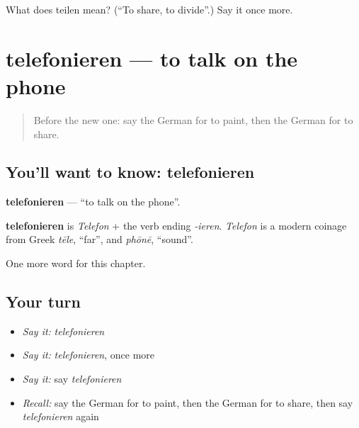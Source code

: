 \begin{tcolorbox}[breakable,colback=teal!4,colframe=teal!35!black,title={Before you move on}]
What does teilen mean? (\textquotedblleft{}To share, to divide\textquotedblright{}.) Say it once more.
\end{tcolorbox}
\section[telefonieren]{telefonieren — to talk on the phone}

\label{lesson:GE-C188-telefonieren}



\begin{quote}
Before the new one: say the German for to paint, then the German for to share.
\end{quote}

\subsection*{You'll want to know: telefonieren}
\textbf{telefonieren} — \textquotedblleft{}to talk on the phone\textquotedblright{}.

\begin{cousinweb}
\textbf{telefonieren} is \emph{Telefon} + the verb ending \emph{-ieren}. \emph{Telefon} is a modern coinage from Greek \emph{tēle}, \textquotedblleft{}far\textquotedblright{}, and \emph{phōnē}, \textquotedblleft{}sound\textquotedblright{}.
\end{cousinweb}

\begin{grammarlens}[title={What you've built}]
One more word for this chapter.
\end{grammarlens}

\subsection*{Your turn}
\begin{itemize}
\raggedright
  \item \emph{Say it:} \emph{telefonieren}
  \item \emph{Say it:} \emph{telefonieren}, once more
  \item \emph{Say it:} say \emph{telefonieren}
  \item \emph{Recall:} say the German for to paint, then the German for to share, then say \emph{telefonieren} again
\end{itemize}

